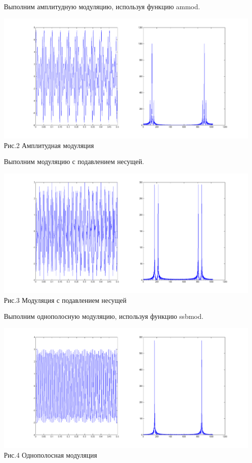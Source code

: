 \documentclass[a4paper]{article}
\begin{document}
Выполним амплитудную модуляцию, используя функцию ammod.

\begin{center}
	\includegraphics[scale = 0.4]{ammod.png} \\Рис.2 Амплитудная модуляция
\end{center}

Выполним модуляцию с подавлением несущей.

\begin{center}
	\includegraphics[scale = 0.4]{sub_mod.png} \\Рис.3 Модуляция с подавлением несущей
\end{center}

Выполним однополосную модуляцию, используя функцию ssbmod.

\begin{center}
	\includegraphics[scale = 0.4]{single_mod.png} \\Рис.4 Однополосная модуляция
\end{center}
\end{document}
